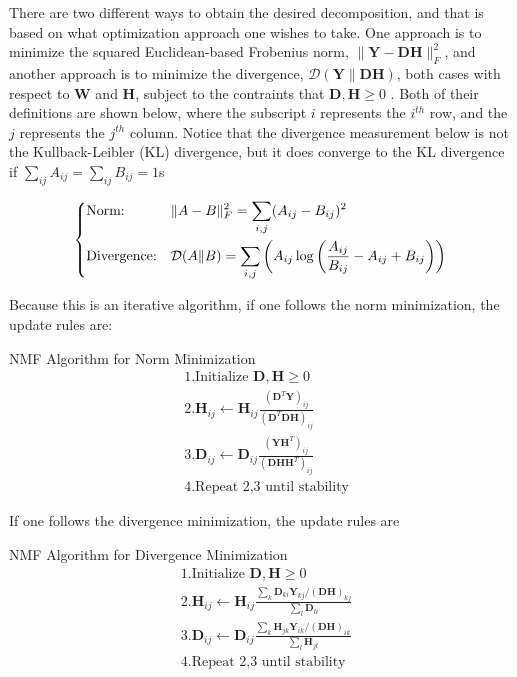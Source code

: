 There are two different ways to obtain the desired decomposition, and that is based on what optimization approach one wishes to take. One approach is to minimize the squared Euclidean-based Frobenius norm, $\| \bm{Y} - \bm{D}\bm{H} \|^2_F $, and another approach is to minimize the divergence, $\mathcal{D}(\bm{Y}\|\bm{DH})$, both cases with respect to $\bm{W}$ and $\bm{H}$, subject to the contraints that $\bm{D},\bm{H} \geq 0$ \cite{nmf2}. Both of their definitions are shown below, where the subscript $i$ represents the $i^{th}$ row, and the $j$ represents the $j^{th}$ column. Notice that the divergence measurement below is not the Kullback-Leibler (KL) divergence, but it does converge to the KL divergence if $\sum_{ij} A_{ij} = \sum_{ij} B_{ij} = 1$s

\begin{equation*}
\begin{dcases}
\text{Norm:} & \|A - B \|^2_F = \sum_{i,j} (A_{ij} - B_{ij})^2 \\
\text{Divergence:} & \mathcal{D}(A\|B) = \sum_{i,j} \left(A_{ij} \log \left( \frac{A_{ij}}{{B_{ij}}}  - A_{ij} + B_{ij} \right) \right)
\end{dcases}
\end{equation*}

Because this is an iterative algorithm, if one follows the norm minimization, the update rules are:

\begin{codebox}
NMF Algorithm for Norm Minimization
\begin{align*}
    &1. \text{Initialize }\bm{D,H} \geq 0 \\
    &2. \bm{H}_{ij} \leftarrow \bm{H}_{ij} \frac{ (\bm{D}^T \bm{Y})_{ij} }{ (\bm{D}^T \bm{D} \bm{H})_{ij} } \\
    &3. \bm{D}_{ij} \leftarrow \bm{D}_{ij} \frac{ (\bm{Y} \bm{H}^T)_{ij} }{ (\bm{D}\bm{H}\bm{H}^T)_{ij} } \\
    &4. \text{Repeat 2,3 until stability}
\end{align*}
\end{codebox}

If one follows the divergence minimization, the update rules are
\begin{codebox}
NMF Algorithm for Divergence Minimization
\begin{align*}
    &1. \text{Initialize }\bm{D,H} \geq 0 \\
    &2. \bm{H}_{ij} \leftarrow \bm{H}_{ij} \frac{ \sum_k \bm{D}_{ki} \bm{Y}_{kj} / (\bm{DH})_{kj} }{ \sum_l \bm{D}_{li} } \\
    &3. \bm{D}_{ij} \leftarrow \bm{D}_{ij} \frac{ \sum_k \bm{H}_{jk} \bm{Y}_{ik} / (\bm{DH})_{ik} }{ \sum_l \bm{H}_{jl} } \\
    &4. \text{Repeat 2,3 until stability}
\end{align*}
\end{codebox}

